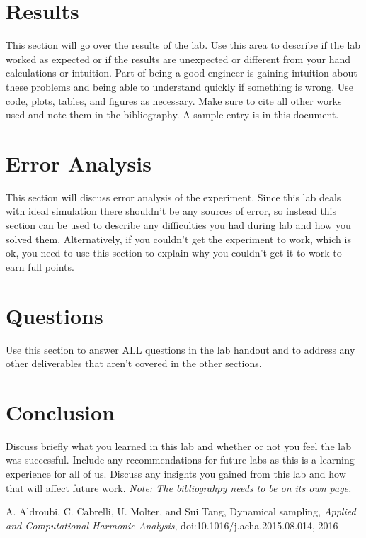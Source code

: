 \documentclass[12pt]{report}
\begin{document}
\section{Results}

This section will go over the results of the lab. Use this area to describe if the lab worked as expected or if the results are unexpected or different from your hand calculations or intuition. Part of being a good engineer is gaining intuition about these problems and being able to understand quickly if something is wrong. Use code, plots, tables, and figures as necessary. Make sure to cite all other works used and note them in the bibliography. A sample entry is in this document.

\section{Error Analysis}

This section will discuss error analysis of the experiment. Since this lab deals with ideal simulation there shouldn't be any sources of error, so instead this section can be used to describe any difficulties you had during lab and how you solved them. Alternatively, if you couldn't get the experiment to work, which is ok, you need to use this section to explain why you couldn't get it to work to earn full points. 

\section{Questions}

Use this section to answer ALL questions in the lab handout and to address any other deliverables that aren't covered in the other sections. 

\section{Conclusion}

Discuss briefly what you learned in this lab and whether or not you feel the lab was successful. Include any recommendations for future labs as this is a learning experience for all of us. Discuss any insights you gained from this lab and how that will affect future work. \textit{Note: The bibliograhpy needs to be on its own page.}

\newpage


\begin{thebibliography}{111}

A. Aldroubi, C. Cabrelli, U. Molter, and Sui Tang,
Dynamical sampling, 
{\it  Applied and Computational Harmonic Analysis}, doi:10.1016/j.acha.2015.08.014, 2016


\end{thebibliography}
\end{document}
